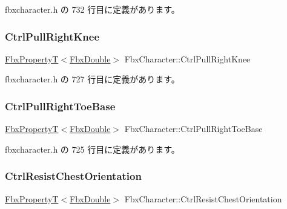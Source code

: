  fbxcharacter.\+h の 732 行目に定義があります。

\mbox{\label{class_fbx_character_a6d0292e3a5f73f3c4c77d904e60556c7}} 
\subsubsection{\texorpdfstring{Ctrl\+Pull\+Right\+Knee}{CtrlPullRightKnee}}
{\footnotesize\ttfamily \hyperlink{class_fbx_property_t}{Fbx\+PropertyT}$<$\hyperlink{fbxtypes_8h_a171e72a1c46fc15c1a6c9c31948c1c5b}{Fbx\+Double}$>$ Fbx\+Character\+::\+Ctrl\+Pull\+Right\+Knee}



 fbxcharacter.\+h の 727 行目に定義があります。

\mbox{\label{class_fbx_character_a2300675a0feed1de9efa5a60e3037b64}} 
\subsubsection{\texorpdfstring{Ctrl\+Pull\+Right\+Toe\+Base}{CtrlPullRightToeBase}}
{\footnotesize\ttfamily \hyperlink{class_fbx_property_t}{Fbx\+PropertyT}$<$\hyperlink{fbxtypes_8h_a171e72a1c46fc15c1a6c9c31948c1c5b}{Fbx\+Double}$>$ Fbx\+Character\+::\+Ctrl\+Pull\+Right\+Toe\+Base}



 fbxcharacter.\+h の 725 行目に定義があります。

\mbox{\label{class_fbx_character_a467f01674d5535cd0de9498171007a9d}} 
\subsubsection{\texorpdfstring{Ctrl\+Resist\+Chest\+Orientation}{CtrlResistChestOrientation}}
{\footnotesize\ttfamily \hyperlink{class_fbx_property_t}{Fbx\+PropertyT}$<$\hyperlink{fbxtypes_8h_a171e72a1c46fc15c1a6c9c31948c1c5b}{Fbx\+Double}$>$ Fbx\+Character\+::\+Ctrl\+Resist\+Chest\+Orientation}



